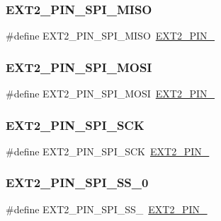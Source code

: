 \subsubsection{\texorpdfstring{EXT2\_PIN\_SPI\_MISO}{EXT2\_PIN\_SPI\_MISO}}
{\footnotesize\ttfamily \#define E\+X\+T2\+\_\+\+P\+I\+N\+\_\+\+S\+P\+I\+\_\+\+M\+I\+SO~\mbox{\hyperlink{group__samd21__xplained__pro__features__group_gaefc6cec2b646fd48133677d5b51d1aad}{E\+X\+T2\+\_\+\+P\+I\+N\+\_}}}

\mbox{\label{group__samd21__xplained__pro__features__group_ga6faf599a23a5bd972d8a2a2aab95396e}} 
\subsubsection{\texorpdfstring{EXT2\_PIN\_SPI\_MOSI}{EXT2\_PIN\_SPI\_MOSI}}
{\footnotesize\ttfamily \#define E\+X\+T2\+\_\+\+P\+I\+N\+\_\+\+S\+P\+I\+\_\+\+M\+O\+SI~\mbox{\hyperlink{group__samd21__xplained__pro__features__group_ga95ae69ffdffda9a1c162ed0a46c40826}{E\+X\+T2\+\_\+\+P\+I\+N\+\_}}}

\mbox{\label{group__samd21__xplained__pro__features__group_gaa2dbe5185b6019956b965574258ebe3d}} 
\subsubsection{\texorpdfstring{EXT2\_PIN\_SPI\_SCK}{EXT2\_PIN\_SPI\_SCK}}
{\footnotesize\ttfamily \#define E\+X\+T2\+\_\+\+P\+I\+N\+\_\+\+S\+P\+I\+\_\+\+S\+CK~\mbox{\hyperlink{group__samd21__xplained__pro__features__group_gad554291e1012a2d7926c5adc8a7582cd}{E\+X\+T2\+\_\+\+P\+I\+N\+\_}}}

\mbox{\label{group__samd21__xplained__pro__features__group_gacde86a97f1fc9642a419b4a244fa9d01}} 
\subsubsection{\texorpdfstring{EXT2\_PIN\_SPI\_SS\_0}{EXT2\_PIN\_SPI\_SS\_0}}
{\footnotesize\ttfamily \#define E\+X\+T2\+\_\+\+P\+I\+N\+\_\+\+S\+P\+I\+\_\+\+S\+S\+\_~\mbox{\hyperlink{group__samd21__xplained__pro__features__group_gac466339304f890fcafb6734155b93322}{E\+X\+T2\+\_\+\+P\+I\+N\+\_}}}

